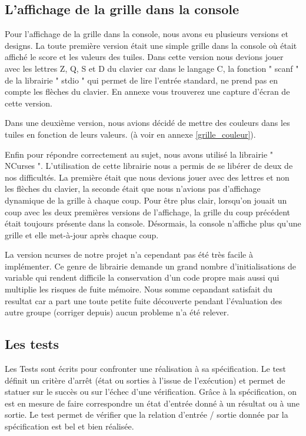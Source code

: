 \documentclass[12pt]{article}
\begin{document}
\subsection{L'affichage de la grille dans la console}
Pour l'affichage de la grille dans la console, nous avons eu plusieurs versions
et designs. La toute première version était une simple grille dans la console
o\`u était affiché le score et les valeurs des tuiles. Dans cette version
nous devions jouer avec les lettres Z, Q, S et D du clavier car dans le langage C, la
fonction " scanf " de la librairie " stdio " qui permet de
lire l'entrée standard, ne prend pas en compte les flèches du clavier.
En annexe vous trouverez une capture d'écran de cette version.\par
Dans une deuxième version, nous avions décidé de mettre des couleurs dans
les tuiles en fonction de leurs valeurs. (à voir en annexe \ref{grille_couleur}).\par
Enfin pour répondre correctement au sujet, nous avons utilisé la librairie
" NCurses ". L'utilisation de cette librairie nous a permis de se
libérer de deux de nos difficultés. La première était que nous devions jouer
avec des lettres et non les flèches du clavier, la seconde était que nous
n'avions pas d'affichage dynamique de la grille à chaque coup. Pour être plus
clair, lorsqu'on jouait un coup avec les deux premières versions de
l'affichage, la grille du coup précédent était toujours présente dans la
console. Désormais, la console n'affiche plus qu'une grille et elle met-à-jour après chaque coup.\par

La version ncurses de notre projet n'a cependant pas été très facile à implémenter.
Ce genre de librairie demande un grand nombre d'initialisations de variable qui rendent
difficile la conservation d'un code propre mais aussi qui multiplie les risques de fuite mémoire.
Nous somme cepandant satisfait du resultat car a part une toute petite fuite
découverte pendant l'évaluation des autre groupe (corriger depuis) aucun probleme n'a été relever.

\subsection{Les tests}
Les Tests sont écrits pour confronter une réalisation à sa spécification.
Le test définit un critère d’arrêt (état ou sorties à l’issue de
l’exécution) et permet de statuer sur le succès ou sur l’échec d’une
vérification. Gr\^ace à la spécification, on est en mesure de faire
correspondre un état d’entrée donné à un résultat ou à une sortie.
Le test permet de vérifier que la relation d’entrée / sortie donnée par la
spécification est bel et bien réalisée.
\cite{Test_unitaire}
\end{document}
